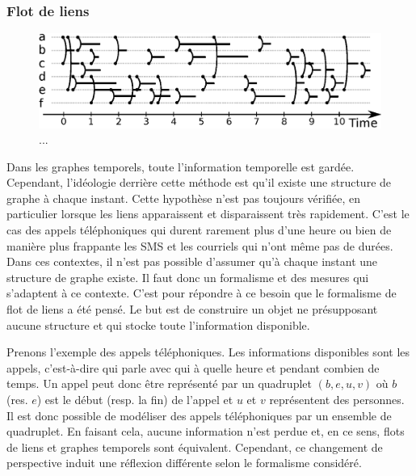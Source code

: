 \subsubsection{Flot de liens}
\begin{figure}[h]
\centering
\includegraphics[width=0.9\linewidth]{img/Intro/Flot_de_liens.eps}
\caption{...}
\label{fig:exemple_Flot_de_liens}
\end{figure}
Dans les graphes temporels, toute l'information temporelle est gardée.
Cependant, l'idéologie derrière cette méthode est qu'il existe une structure de graphe à chaque instant.
Cette hypothèse n'est pas toujours vérifiée, en particulier lorsque les liens apparaissent et disparaissent très rapidement.
C'est le cas des appels téléphoniques qui durent rarement plus d'une heure ou bien de manière plus frappante les SMS et les courriels qui n'ont même pas de durées.
Dans ces contextes, il n'est pas possible d'assumer qu'à chaque instant une structure de graphe existe.
Il faut donc un formalisme et des mesures qui s'adaptent à ce contexte.
C'est pour répondre à ce besoin que le formalisme de flot de liens a été pensé.
Le but est de construire un objet ne présupposant aucune structure et qui stocke toute l'information disponible.


Prenons l'exemple des appels téléphoniques.
Les informations disponibles sont les appels, c'est-à-dire qui parle avec qui à quelle heure et pendant combien de temps.
Un appel peut donc être représenté par un quadruplet $(b,e,u,v)$ où $b$ (res. $e$) est le début (resp. la fin) de l'appel et $u$ et $v$ représentent des personnes.
Il est donc possible de modéliser des appels téléphoniques par un ensemble de quadruplet.
En faisant cela, aucune information n'est perdue et, en ce sens, flots de liens et graphes temporels sont équivalent. 
Cependant, ce changement de perspective induit une réflexion différente selon le formalisme considéré.

